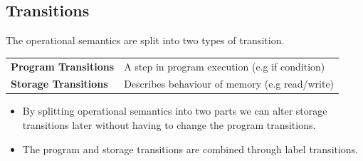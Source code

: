 \subsection{Transitions}
The operational semantics are split into two types of transition.
\begin{center}
	\begin{tabular}{l p{}}
		\textbf{Program Transitions} & A step in program execution (e.g if condition) \\
		\textbf{Storage Transitions} & Describes behaviour of memory (e.g read/write) \\
	\end{tabular}
\end{center}
\begin{itemize}
	\item By splitting operational semantics into two parts we can alter storage transitions later without having to change the program transitions.
	\item The program and storage transitions are combined through label transitions.
\end{itemize}

